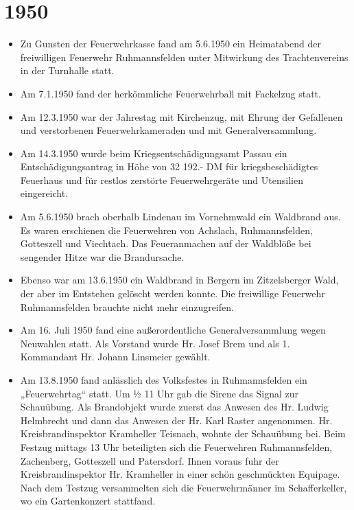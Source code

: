 \documentclass[12pt,a4paper]{book}
\begin{document}
\section*{1950}

\begin{itemize}
\item Zu Gunsten der Feuerwehrkasse fand am 5.6.1950 ein Heimatabend der
freiwilligen Feuerwehr Ruhmannsfelden unter Mitwirkung des Trachtenvereins in
der Turnhalle statt.

\item Am 7.1.1950 fand der herkömmliche Feuerwehrball mit Fackelzug statt.

\item Am 12.3.1950 war der Jahrestag mit Kirchenzug, mit Ehrung der Gefallenen
und verstorbenen Feuerwehrkameraden und mit Generalversammlung.

\item Am 14.3.1950 wurde beim Kriegsentschädigungsamt Passau ein
Entschädigungsantrag in Höhe von 32 192.- DM für kriegsbeschädigtes Feuerhaus
und für restlos zerstörte Feuerwehrgeräte und Utensilien eingereicht.

\item Am 5.6.1950 brach oberhalb Lindenau im Vornehmwald ein Waldbrand aus. Es
waren erschienen die Feuerwehren von Achslach, Ruhmannsfelden, Gotteszell und
Viechtach. Das Feueranmachen auf der Waldblöße bei sengender Hitze war die
Brandursache.

\item Ebenso war am 13.6.1950 ein Waldbrand in Bergern im Zitzelsberger Wald,
der aber im Entstehen gelöscht werden konnte. Die freiwillige Feuerwehr
Ruhmannsfelden brauchte nicht mehr einzugreifen.

\item Am 16. Juli 1950 fand eine außerordentliche Generalversammlung wegen
Neuwahlen statt. Als Vorstand wurde Hr. Josef Brem und als 1. Kommandant Hr.
Johann Linsmeier gewählt.

\item Am 13.8.1950 fand anlässlich des Volksfestes in Ruhmannsfelden ein
„Feuerwehrtag“ statt. Um ½ 11 Uhr gab die Sirene das Signal zur Schauübung. Als
Brandobjekt wurde zuerst das Anwesen des Hr. Ludwig Helmbrecht und dann das
Anwesen der Hr. Karl Raster angenommen. Hr. Kreisbrandinspektor Kramheller
Teisnach, wohnte der Schauübung bei. Beim Festzug mittags 13 Uhr beteiligten
sich die Feuerwehren Ruhmannsfelden, Zachenberg, Gotteszell und Patersdorf.
Ihnen voraus fuhr der Kreisbrandinspektor Hr. Kramheller in einer schön
geschmückten Equipage. Nach dem Testzug versammelten sich die Feuerwehrmänner im
Schafferkeller, wo ein Gartenkonzert stattfand.


\end{itemize}
\end{document}
